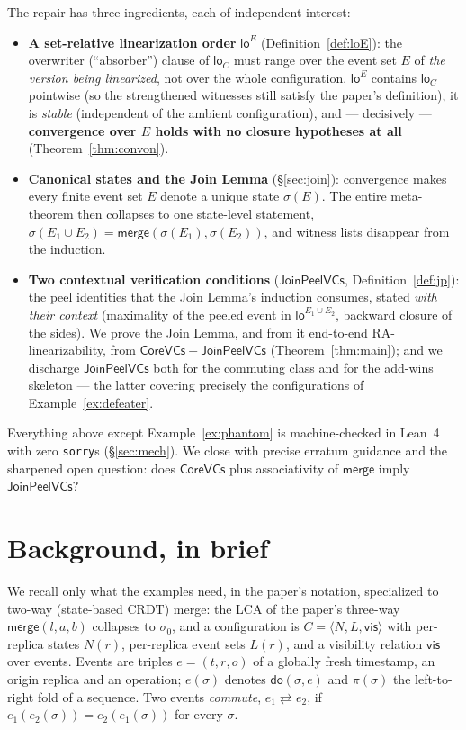 \documentclass[11pt]{article}
\newcommand{\comm}{\rightleftarrows}
\newcommand{\Merge}{\mathsf{merge}}
\newcommand{\Sinit}{\sigma_0}
\newcommand{\loE}[1]{\mathsf{lo}^{#1}}
\newcommand{\co}{\mathsf{CoreVCs}}
\newcommand{\jp}{\mathsf{JoinPeelVCs}}
\newcommand{\lean}[1]{\texttt{#1}}
\begin{document}
The repair has three ingredients, each of independent interest:

\begin{itemize}[leftmargin=2em]
\item \textbf{A set-relative linearization order} $\loE{E}$
(Definition~\ref{def:loE}): the overwriter (``absorber'') clause of
$\mathsf{lo}_C$ must range over the event set $E$ of \emph{the version
being linearized}, not over the whole configuration. $\loE{E}$ contains
$\mathsf{lo}_C$ pointwise (so the strengthened witnesses still satisfy
the paper's definition), it is \emph{stable} (independent of the ambient
configuration), and --- decisively --- \textbf{convergence over $E$ holds
with no closure hypotheses at all} (Theorem~\ref{thm:convon}).
\item \textbf{Canonical states and the Join Lemma}
(\S\ref{sec:join}): convergence makes every finite event set $E$ denote a
unique state $\sigma(E)$. The entire meta-theorem then collapses to one
state-level statement,
$\sigma(E_1 \cup E_2) = \Merge(\sigma(E_1), \sigma(E_2))$,
and witness lists disappear from the induction.
\item \textbf{Two contextual verification conditions} ($\jp$,
Definition~\ref{def:jp}): the peel identities that the Join Lemma's
induction consumes, stated \emph{with their context} (maximality of the
peeled event in $\loE{E_1\cup E_2}$, backward closure of the sides). We
prove the Join Lemma, and from it end-to-end RA-linearizability, from
$\co + \jp$ (Theorem~\ref{thm:main}); and we discharge $\jp$ both for the
commuting class and for the add-wins skeleton --- the latter covering
precisely the configurations of Example~\ref{ex:defeater}.
\end{itemize}

Everything above except Example~\ref{ex:phantom} is machine-checked in
Lean~4 with zero \lean{sorry}s (\S\ref{sec:mech}). We close with precise
erratum guidance and the sharpened open question: does $\co$ plus
associativity of $\Merge$ imply $\jp$?

\section{Background, in brief}
\label{sec:background}

We recall only what the examples need, in the paper's notation,
specialized to two-way (state-based CRDT) merge: the LCA of the paper's
three-way $\Merge(l,a,b)$ collapses to $\Sinit$, and a configuration is
$C = \langle N, L, \mathsf{vis}\rangle$ with per-replica states $N(r)$,
per-replica event sets $L(r)$, and a visibility relation $\mathsf{vis}$
over events. Events are triples $e = (t, r, o)$ of a globally fresh
timestamp, an origin replica and an operation; $e(\sigma)$ denotes
$\mathsf{do}(\sigma, e)$ and $\pi(\sigma)$ the left-to-right fold of a
sequence. Two events \emph{commute}, $e_1 \comm e_2$, if
$e_1(e_2(\sigma)) = e_2(e_1(\sigma))$ for every $\sigma$.
\end{document}
